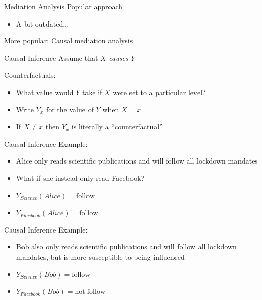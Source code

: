 \documentclass[14pt]{beamer}
\begin{document}
\begin{frame}{Mediation Analysis}
    Popular approach
    \begin{itemize}
        \item A bit outdated\ldots \newline
    \end{itemize}

    More popular: Causal mediation analysis
    
\end{frame}

\begin{frame}{Causal Inference}
    Assume that $X$ \textit{causes} $Y$\newline

    Counterfactuals:
    \begin{itemize}
        \item What value would $Y$ take if $X$ were set to a particular level?
        \item Write $Y_x$ for the value of $Y$ when $X=x$
        \item If $X\neq x$ then $Y_x$ is literally a ``counterfactual'' 
    \end{itemize}
\end{frame}

\begin{frame}{Causal Inference}
    Example:
    \begin{itemize}
        \item Alice only reads scientific publications and will follow all lockdown mandates
        \item What if she instead only read Facebook?\newline
        \item $Y_{Science}(Alice) = \mathrm{follow}$
        \item $Y_{Facebook}(Alice) = \mathrm{follow}$
    \end{itemize}
\end{frame}

\begin{frame}{Causal Inference}
    Example:
    \begin{itemize}
        \item Bob also only reads scientific publications and will follow all lockdown mandates, but is more susceptible to being influenced \newline
        \item $Y_{Science}(Bob) = \mathrm{follow}$
        \item $Y_{Facebook}(Bob) = \mathrm{not\ follow}$
    \end{itemize}
\end{frame}
\end{document}
